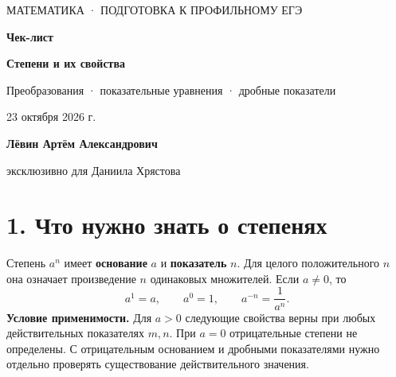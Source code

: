 \documentclass[a4paper,12pt]{article}
\renewcommand{\today}{23 октября 2026 г.}
\newcommand{\key}[1]{\textcolor{darkaccent}{\textbf{#1}}}
\begin{document}
\begin{titlepage}
\thispagestyle{empty}
\begin{center}
\vspace*{30mm}
{\color{darkaccent}\large МАТЕМАТИКА · ПОДГОТОВКА К ПРОФИЛЬНОМУ ЕГЭ}\par
\vspace{22mm}
{\color{darkaccent}\fontsize{34}{39}\selectfont\bfseries Чек-лист}\par
\vspace{10mm}
{\fontsize{22}{28}\selectfont\bfseries Степени и их свойства}\par
\vspace{4mm}
{\large Преобразования · показательные уравнения · дробные показатели}\par
\vspace{23mm}
{\large \today}\par
\vfill
{\normalsize\bfseries Лёвин Артём Александрович}\par
{\normalsize эксклюзивно для Даниила Хрястова}\par
\vspace{19mm}
\vspace{9mm}
\end{center}
\end{titlepage}

\section*{1. Что нужно знать о степенях}
Степень $a^n$ имеет \key{основание} $a$ и \key{показатель} $n$. Для целого положительного $n$ она означает произведение $n$ одинаковых множителей. Если $a\ne0$, то
\[
 a^1=a,\qquad a^0=1,\qquad a^{-n}=\frac{1}{a^n}.
\]
\key{Условие применимости.} Для $a>0$ следующие свойства верны при любых действительных показателях $m,n$. При $a=0$ отрицательные степени не определены. С отрицательным основанием и дробными показателями нужно отдельно проверять существование действительного значения.
\end{document}
